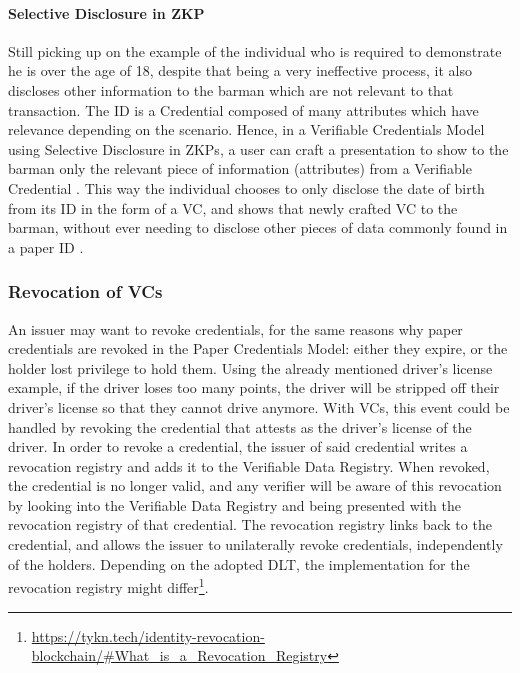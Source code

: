 \paragraph{Selective Disclosure in ZKP}

Still picking up on the example of the individual who is required to demonstrate he is over the age of 18, despite that being a very ineffective process, it also discloses other information to the barman which are not relevant to that transaction. The ID is a Credential composed of many attributes which have relevance depending on the scenario. Hence, in a Verifiable Credentials Model using Selective Disclosure in ZKPs, a user can craft a presentation to show to the barman only the relevant piece of information (attributes) from a Verifiable Credential \cite{fedrecheski2020self}. This way the individual chooses to only disclose the date of birth from its ID in the form of a VC, and shows that newly crafted VC to the barman, without ever needing to disclose other pieces of data commonly found in a paper ID \cite{davie2019trust}. 

\subsubsection{Revocation of VCs}
\label{subsubsection:revocation_registries}

An issuer may want to revoke credentials, for the same reasons why paper credentials are revoked in the Paper Credentials Model: either they expire, or the holder lost privilege to hold them. Using the already mentioned driver's license example, if the driver loses too many points, the driver will be stripped off their driver's license so that they cannot drive anymore. With VCs, this event could be handled by revoking the credential that attests as the driver's license of the driver. In order to revoke a credential, the issuer of said credential writes a revocation registry and adds it to the Verifiable Data Registry. When revoked, the credential is no longer valid, and any verifier will be aware of this revocation by looking into the Verifiable Data Registry and being presented with the revocation registry of that credential.
The revocation registry links back to the credential, and allows the issuer to unilaterally revoke credentials, independently of the holders. Depending on the adopted DLT, the implementation for the revocation registry might differ\footnote{\url{https://tykn.tech/identity-revocation-blockchain/\#What_is_a_Revocation_Registry}}.

